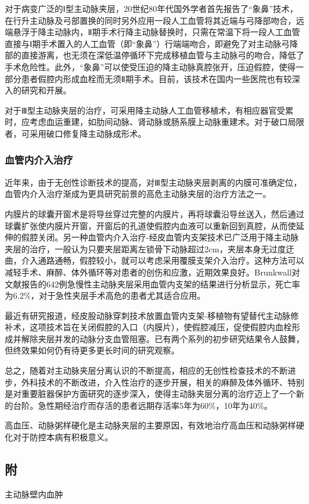 对于病变广泛的Ⅰ型主动脉夹层，20世纪80年代国外学者首先报告了“象鼻”技术，在行升主动脉及弓部置换的同时另外应用一段人工血管将其近端与弓降部吻合，远端悬浮于降主动脉内，Ⅱ期手术行降主动脉替换时，只需在常温下将一段人工血管直接与Ⅰ期手术置入的人工血管（即“象鼻”）行端端吻合，即避免了对主动脉弓降部的直接游离，也无须在深低温停循环下完成移植血管与主动脉弓的吻合，降低了手术危险性。此外，“象鼻”可以使受压迫的降主动脉真腔张开，压迫假腔，使得一部分患者假腔内形成血栓而无须Ⅱ期手术。目前，该技术在国内一些医院也有较深入的研究和开展。

对于Ⅲ型主动脉夹层的治疗，可采用降主动脉人工血管移植术，有相应器官受累时，应考虑血运重建，如肋间动脉、肾动脉或肠系膜上动脉重建术。对于破口局限者，可采用破口修复降主动脉成形术。

\subsubsection{血管内介入治疗}

近年来，由于无创性诊断技术的提高，对Ⅲ型主动脉夹层剥离的内膜可准确定位，血管内介入治疗渐成为更具研究前景的高危主动脉夹层的治疗方法之一。

内膜片的球囊开窗术是将导丝穿过完整的内膜片，再将球囊沿导丝送入，然后通过球囊扩张使内膜片开窗，开窗后的孔道使假腔内血液可以重新回到真腔，从而使延伸的假腔关闭。另一种血管内介入治疗-经皮血管内支架技术已广泛用于降主动脉夹层的治疗，一般认为只要夹层距离左锁骨下动脉超过2cm，夹层本身无过度迂曲，介入通路通畅，假腔较小，就可以考虑采用覆膜支架介入治疗。这种方法可以减轻手术、麻醉、体外循环等对患者的创伤和应激，近期效果良好。Brunkwall对文献报告的642例急慢性主动脉夹层采用血管内支架的结果进行分析显示，死亡率为6.2\%，对于急性夹层手术高危的患者尤其适合应用。

最近有研究报道，经皮股动脉穿刺技术放置血管内支架-移植物有望替代主动脉修补术，这项技术旨在关闭假腔的入口（内膜片），使假腔减压，促使假腔内血栓形成并解除夹层并发的动脉分支血管阻塞。已有两个系列的初步研究结果令人鼓舞，但终效果如何仍有待更多更长时间的研究观察。

总之，随着对主动脉夹层分离认识的不断提高，相应的无创性检查技术的不断进步，外科技术的不断改进，介入性治疗的逐步开展，相关的麻醉及体外循环、特别是对重要脏器保护方面研究的逐步深入，使得主动脉夹层分离的治疗迈上了一个新的台阶。急性期经治疗而存活的患者远期存活率5年为60\%，10年为40\%。

高血压、动脉粥样硬化是主动脉夹层的主要原因，有效地治疗高血压和动脉粥样硬化对于防控本病有积极意义。

\subsection{附} 主动脉壁内血肿

